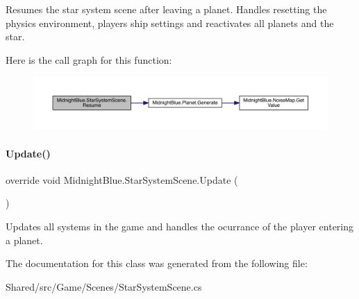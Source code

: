 Resumes the star system scene after leaving a planet. Handles resetting the physics environment, players ship settings and reactivates all planets and the star. 

Here is the call graph for this function\+:\nopagebreak
\begin{figure}[H]
\begin{center}
\leavevmode
\includegraphics[width=350pt]{class_midnight_blue_1_1_star_system_scene_aefbf0750a7ce153b923bcabb132e4875_cgraph}
\end{center}
\end{figure}
\hypertarget{class_midnight_blue_1_1_star_system_scene_ac36506b721064e015a9f93140681d93a}{}\label{class_midnight_blue_1_1_star_system_scene_ac36506b721064e015a9f93140681d93a} 
\paragraph{\texorpdfstring{Update()}{Update()}}
{\footnotesize\ttfamily override void Midnight\+Blue.\+Star\+System\+Scene.\+Update (\begin{DoxyParamCaption}{ }\end{DoxyParamCaption})\hspace{0.3cm}{\ttfamily [inline]}}



Updates all systems in the game and handles the ocurrance of the player entering a planet. 



The documentation for this class was generated from the following file\+:\begin{DoxyCompactItemize}
\item 
Shared/src/\+Game/\+Scenes/Star\+System\+Scene.\+cs\end{DoxyCompactItemize}
